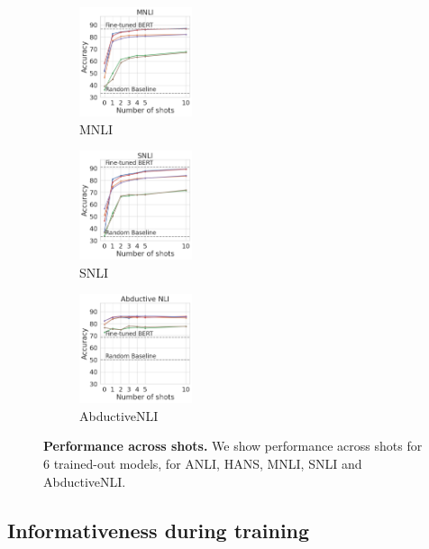 \begin{figure}[t]
    \begin{subfigure}[b]{0.19\textwidth}
    \centering
    \includegraphics[height=3.2cm, trim=25mm 0 0 0, clip]{figures/mnli_matched}
    \caption{MNLI}
    \label{fig:mnli}
    \end{subfigure}
    \begin{subfigure}[b]{0.19\textwidth}
    \centering
    \includegraphics[height=3.2cm, trim=25mm 0 0 0, clip]{figures/snli}
    \caption{SNLI}
    \label{fig:snli}
    \end{subfigure}
    \begin{subfigure}[b]{0.19\textwidth}
    \centering
    \includegraphics[height=3.2cm, trim=25mm 0 0 0, clip]{figures/abductivenli}
    \caption{AbductiveNLI}
    \label{fig:abductivenli}
    \end{subfigure}
    \caption{\textbf{Performance across shots.} We show performance across shots for 6 trained-out models, for ANLI, HANS, MNLI, SNLI and AbductiveNLI.}\label{fig:shot_performance}
\end{figure}

\subsection{Informativeness during training}\label{subsec:during_training}

